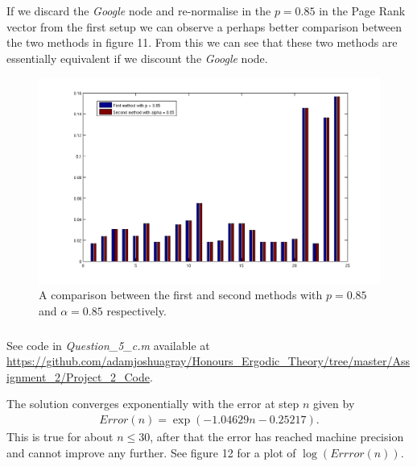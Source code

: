 \documentclass{unswmaths}
\begin{document}
If we discard the \emph{Google} node and re-normalise in the $ p = 0.85 $ in the Page Rank vector from the first setup we can observe a perhaps better comparison between the two methods in figure 11. From this we can see that these two methods are essentially equivalent if we discount the \emph{Google} node.

\begin{figure}[h]
    \includegraphics[scale=0.4]{Comparison}
    \caption{A comparison between the first and second methods with $ p = 0.85 $ and $ \alpha = 0.85 $ respectively.}
\end{figure}


\subsubsection{}
See code in \emph{Question\_5\_c.m} available at \url{https://github.com/adamjoshuagray/Honours_Ergodic_Theory/tree/master/Assignment_2/Project_2_Code}. 

The solution converges exponentially with the error at step $ n $ given by
\begin{align*}
    Error(n) = \exp(-1.04629n - 0.25217).
\end{align*}
This is true for about $ n \leq 30 $, after that the error has reached machine precision and cannot improve any further. See figure 12 for a plot of $ \log(Errror(n)) $.
\end{document}
